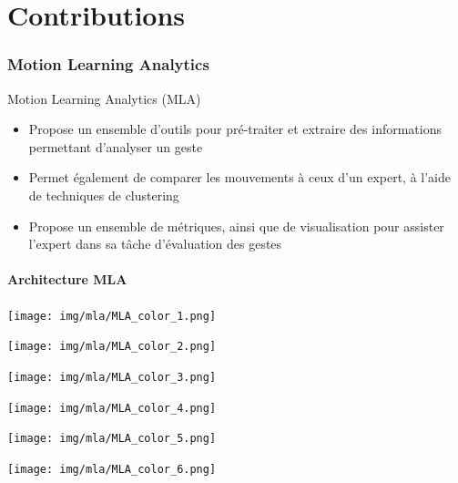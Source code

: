 \documentclass[svgnames]{beamer}
\begin{document}
	\part{Contributions}
	\section{Motion Learning Analytics}
	\begin{frame}{\secname}
		\begin{block}{Motion Learning Analytics (MLA)}
			\begin{itemize}[label=$\bullet$]
				\item Propose un ensemble d'outils pour pré-traiter et extraire des informations permettant d'analyser un geste
				\item Permet également de comparer les mouvements à ceux d'un expert, à l'aide de techniques de clustering
				\item Propose un ensemble de métriques, ainsi que de visualisation pour assister l'expert dans sa tâche d'évaluation des gestes
			\end{itemize}
		\end{block}
	\end{frame}
	
	\subsection{Architecture MLA}
	\begin{frame}{\subsecname}
	\centering
		\texttt{[image: img/mla/MLA\_color\_1.png]}
	\end{frame}

	\begin{frame}{\subsecname}
	\centering
		\texttt{[image: img/mla/MLA\_color\_2.png]}
	\end{frame}

	\begin{frame}{\subsecname}
	\centering
		\texttt{[image: img/mla/MLA\_color\_3.png]}
	\end{frame}

	\begin{frame}{\subsecname}
	\centering
		\texttt{[image: img/mla/MLA\_color\_4.png]}
	\end{frame}

	\begin{frame}{\subsecname}
	\centering
		\texttt{[image: img/mla/MLA\_color\_5.png]}
	\end{frame}

	\begin{frame}{\subsecname}
	\centering
		\texttt{[image: img/mla/MLA\_color\_6.png]}
	\end{frame}
\end{document}
